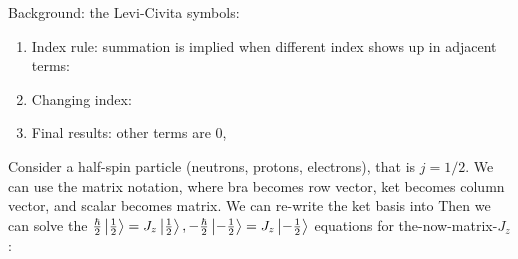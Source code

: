 \documentclass{school-22.101-notes}
\begin{document}
Background: the Levi-Civita symbols:
\begin{enumerate}
\item Index rule: summation is implied when different index shows up in adjacent terms:
\item Changing index: 
\item Final results: other terms are 0, 
\end{enumerate}

\clearpage
{}
Consider a half-spin particle (neutrons, protons, electrons), that is $j = 1/2$. We can use the matrix notation, where bra becomes row vector, ket becomes column vector, and scalar becomes matrix. We can re-write the ket basis into 
Then we can solve the $\frac{\hbar}{2} \left| \frac{1}{2} \right> = J_z \left| \frac{1}{2} \right>, - \frac{\hbar}{2} \left| -\frac{1}{2} \right> = J_z \left| -\frac{1}{2} \right>$ equations for the-now-matrix-$J_z$: 
\end{document}
